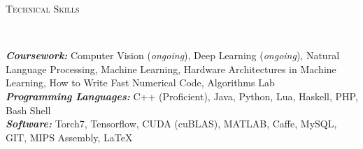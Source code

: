 \documentclass[9pt]{article}
\newenvironment{changemargin}[2]{%
  \begin{list}{}{%
      \setlength{\topsep}{0pt}%
    \setlength{\leftmargin}{#1}%
    \setlength{\rightmargin}{#2}%
    \setlength{\listparindent}{\parindent}%
  \setlength{\itemindent}{\parindent}%
    \setlength{\parsep}{\parskip}%
    }%
  \item[]}{\end{list}
    }
\newcommand{\lineover}{
  \begin{changemargin}{-0.05in}{-0.10in}
    \vspace*{-9pt}
    \hrulefill \\
    \vspace*{-2pt}
  \end{changemargin}
}
\newcommand{\header}[1]{
  \begin{changemargin}{-0.5in}{-0.5in}
    \scshape{#1}\\
        \lineover
  \end{changemargin}
}
\newenvironment{body} {
  \vspace*{-16pt}
        \begin{changemargin}{-0.6in}{-0.65in}
        }	
        {\end{changemargin}
}
\begin{document}
\vspace{3 mm}
\header{Technical Skills}

\vspace{3 mm}
\begin{body}
  \vspace{14pt}
        \begin{changemargin}{0.15in}{0.15in}
          \emph{\textbf{Coursework:}} Computer Vision (\emph{ongoing}), 
          Deep Learning (\emph{ongoing}), Natural Language Processing, Machine 
          Learning, Hardware Architectures in Machine Learning, 
          How to Write Fast Numerical Code, Algorithms Lab \\
          \emph{\textbf{Programming Languages: }}{} C++ (Proficient), Java, Python, 
          Lua, Haskell, PHP, Bash Shell\\
          \emph{\textbf{Software: }}{} Torch7, Tensorflow, CUDA (cuBLAS), MATLAB, 
          Caffe, MySQL, GIT, MIPS Assembly, \LaTeX \\
        \end{changemargin}
\end{body}
\end{document}

